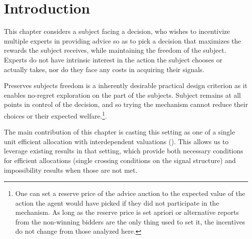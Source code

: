 
\section{Introduction}



This chapter considers a subject facing a decision, who wishes to incentivize multiple experts in providing advice so as to pick a decision that maximizes the rewards the subject receives, while maintaining the freedom of the subject.
Experts do not have intrinsic interest in the action the subject chooses or actually takes, nor do they face any costs in acquiring their signals.

Preserves subjects freedom is a inherently desirable practical design criterion as it enables no-regret exploration on the part of the subjects. Subject remains at all points in control of the decision, and so trying the mechanism cannot reduce their choices or their expected welfare.\footnote{One can set a reserve price of the advice auction to the expected value of the action the agent would have picked if they did not participate in the mechanism. As long as the reserve price is set apriori or alternative reports from the non-winning bidders are the only thing used to set it, the incentives do not change from those analyzed here.}.



The main contribution of this chapter is casting this setting as one of a single unit efficient allocation with interdependent valuations (\cite{milgrom1982theory,maskin1992auctions,ausubel1999generalized,mclean2004informational,roughgarden2016optimal,eden2018interdependent}).
This allows us to leverage existing results in that setting, which provide both necessary conditions for efficient allocations (single crossing conditions on the signal structure) and impossibility results when those are not met.

